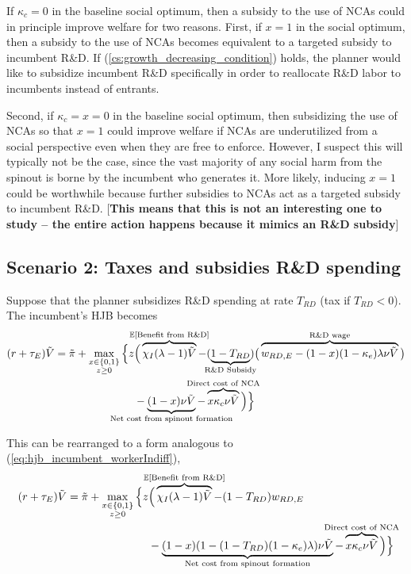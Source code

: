 \documentclass[11pt,english]{article}
\theoremstyle{remark}
\begin{document}
If $\kappa_c = 0$ in the baseline social optimum, then a subsidy to the use of NCAs could in principle improve welfare for two reasons. First, if $x = 1$ in the social optimum, then a subsidy to the use of NCAs becomes equivalent to a targeted subsidy to incumbent R\&D. If (\ref{cs:growth_decreasing_condition}) holds, the planner would like to subsidize incumbent R\&D specifically in order to reallocate R\&D labor to incumbents instead of entrants. 

Second, if $\kappa_c = x = 0$ in the baseline social optimum, then subsidizing the use of NCAs so that $x = 1$ could improve welfare if NCAs are underutilized from a social perspective even when they are free to enforce. However, I suspect this will typically not be the case, since the vast majority of any social harm from the spinout is borne by the incumbent who generates it. More likely, inducing $x = 1$ could be worthwhile because further subsidies to NCAs act as a targeted subsidy to incumbent R\&D. [\textbf{This means that this is not an interesting one to study -- the entire action happens because it mimics an R\&D subsidy}]

\subsection{Scenario 2: Taxes and subsidies R\&D spending}

Suppose that the planner subsidizes R\&D spending at rate $T_{RD}$ (tax if $T_{RD} < 0$). The incumbent's HJB becomes
\begin{align}
	(r + \tau_E) \tilde{V} = \tilde{\pi} + \max_{\substack{x \in \{0,1\} \\ z \ge 0}} \Big\{z &\Big( \overbrace{\chi_I (\lambda - 1) \tilde{V}}^{\mathclap{\mathbb{E}[\textrm{Benefit from R\&D}]}}- (\underbrace{1-T_{RD}}_{\mathclap{\text{R\&D Subsidy}}}) \big( \overbrace{w_{RD,E} - (1-x)(1-\kappa_e)\lambda \nu \tilde{V}}^{\mathclap{\text{R\&D wage}}}\big) \label{eq:hjb_incumbent_RDsubsidy} \nonumber \\ 
	&-  \underbrace{(1-x) \nu \tilde{V}}_{\mathclap{\text{Net cost from spinout formation}}} - \overbrace{x \kappa_{c} \nu \tilde{V}}^{\mathclap{\text{Direct cost of NCA}}}\Big) \Big\} 
\end{align}

This can be rearranged to a form analogous to (\ref{eq:hjb_incumbent_workerIndiff}),
\begin{align}
	(r + \tau_E) \tilde{V} = \tilde{\pi} + \max_{\substack{x \in \{0,1\} \\ z \ge 0}} \Big\{z &\Big( \overbrace{\chi_I (\lambda - 1) \tilde{V}}^{\mathclap{\mathbb{E}[\textrm{Benefit from R\&D}]}}- (1-T_{RD}) w_{RD,E} \\
	&-  \underbrace{(1-x)(1 - (1-T_{RD})(1-\kappa_{e})\lambda)\nu \tilde{V}}_{\mathclap{\text{Net cost from spinout formation}}} - \overbrace{x \kappa_{c} \nu \tilde{V}}^{\mathclap{\text{Direct cost of NCA}}}\Big) \Big\} \label{eq:hjb_incumbent_RDsubsidy_2}
\end{align}
\end{document}
